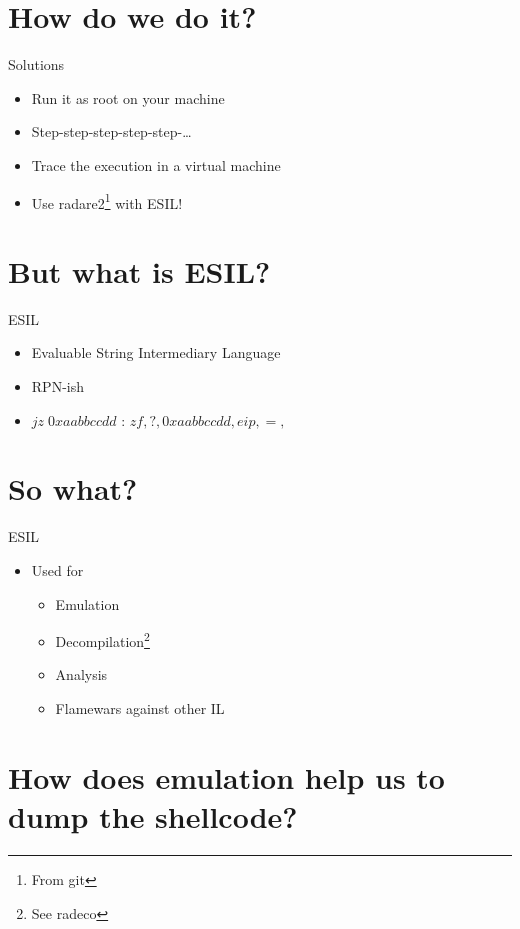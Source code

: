 \documentclass{beamer}
\begin{document}
\section{How do we do it?}

\begin{frame}{Solutions}
	\begin{itemize}[<+->]
		\item Run it as root on your machine
		\item Step-step-step-step-step-…
		\item Trace the execution in a virtual machine
		\item Use radare2\footnote{From git} with ESIL!
	\end{itemize}
\end{frame}

\section{But what is ESIL?}

\begin{frame}{ESIL}
	\begin{itemize}
		\item Evaluable String Intermediary Language
		\item RPN-ish
		\item \alert{$jz\;0xaabbccdd$} :  $zf,?{,0xaabbccdd,eip,=,}$
	\end{itemize}
\end{frame}

\section{So what?}

\begin{frame}{ESIL}
	\begin{itemize}
		\item Used for
			\begin{itemize}[<+->]
				\item Emulation
				\item Decompilation\footnote{See radeco}
				\item Analysis
				\item Flamewars against other IL
			\end{itemize}
		\end{itemize}
\end{frame}

\section{How does emulation help us to dump the shellcode?}
\end{document}
